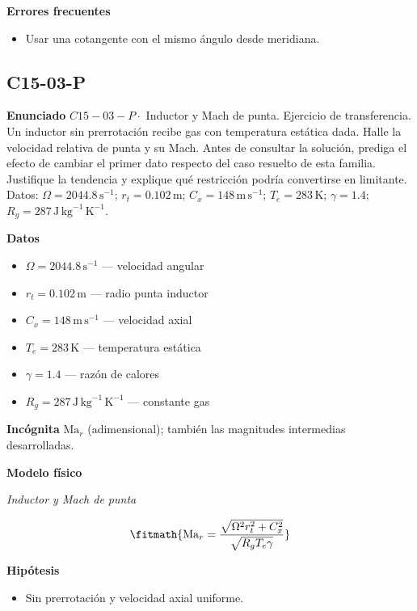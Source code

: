\documentclass[10pt,openany]{book}
\begin{document}
\noindent\textbf{Errores frecuentes}
\begin{itemize}
\item Usar una cotangente con el mismo ángulo desde meridiana.
\end{itemize}
\subsection*{C15-03-P}

\noindent\textbf{Enunciado}
\(C15-03-P \cdot\) Inductor y Mach de punta. Ejercicio de transferencia. Un inductor sin prerrotación recibe gas con temperatura estática dada. Halle la velocidad relativa de punta y su Mach. Antes de consultar la solución, prediga el efecto de cambiar el primer dato respecto del caso resuelto de esta familia. Justifique la tendencia y explique qué restricción podría convertirse en limitante. Datos: \(\Omega=2044.8\, \mathrm{s}^{-1}\); \(r_t=0.102\, \mathrm{m}\); \(C_x=148\, \mathrm{m}\,\mathrm{s}^{-1}\); \(T_e=283\, \mathrm{K}\); \(\gamma=1.4\); \(R_g=287\, \mathrm{J}\,\mathrm{kg}^{-1}\,\mathrm{K}^{-1}\).

\noindent\textbf{Datos}
\begin{itemize}
\item $\Omega = 2044.8\,\mathrm{s}^{-1}$ — velocidad angular
\item $r_t = 0.102\,\mathrm{m}$ — radio punta inductor
\item $C_x = 148\,\mathrm{m}\,\mathrm{s}^{-1}$ — velocidad axial
\item $T_e = 283\,\mathrm{K}$ — temperatura estática
\item $\gamma = 1.4$ — razón de calores
\item $R_g = 287\,\mathrm{J}\,\mathrm{kg}^{-1}\,\mathrm{K}^{-1}$ — constante gas
\end{itemize}

\noindent\textbf{Incógnita}
$\mathrm{Ma}_r$ (adimensional); también las magnitudes intermedias desarrolladas.

\noindent\textbf{Modelo físico}

\noindent\textit{Inductor y Mach de punta}

\[
\fitmath{\mathrm{Ma}_r=\frac{\sqrt{\Omega^{2} r_t^{2} + C_x^{2}}}{\sqrt{R_g T_e \gamma}}}
\]

\noindent\textbf{Hipótesis}
\begin{itemize}
\item Sin prerrotación y velocidad axial uniforme.
\end{itemize}
\end{document}
